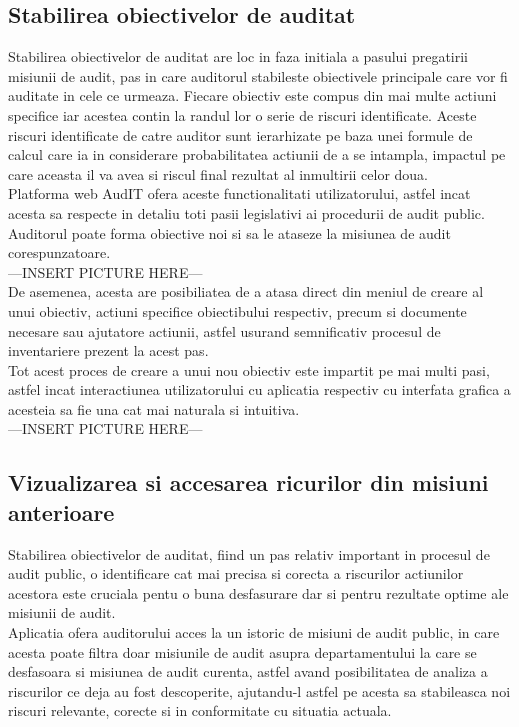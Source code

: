 \subsection{Stabilirea obiectivelor de auditat}

Stabilirea obiectivelor de auditat are loc in faza initiala a pasului pregatirii misiunii de audit, pas in care auditorul stabileste obiectivele principale care vor fi auditate in cele ce urmeaza. Fiecare obiectiv este compus din mai multe actiuni specifice iar acestea contin la randul lor o serie de riscuri identificate. Aceste riscuri identificate de catre auditor sunt ierarhizate pe baza unei formule de calcul care ia in considerare probabilitatea actiunii de a se intampla, impactul pe care aceasta il va avea si riscul final rezultat al inmultirii celor doua.\\
Platforma web AudIT ofera aceste functionalitati utilizatorului, astfel incat acesta sa respecte in detaliu toti pasii legislativi ai procedurii de audit public. Auditorul poate forma obiective noi si sa le ataseze la misiunea de audit corespunzatoare.\\
---INSERT PICTURE HERE---\\
De asemenea, acesta are posibiliatea de a atasa direct din meniul de creare al unui obiectiv, actiuni specifice obiectibului respectiv, precum si documente necesare sau ajutatore actiunii, astfel usurand semnificativ procesul de inventariere prezent la acest pas.\\
Tot acest proces  de creare a unui nou obiectiv este impartit pe mai multi pasi, astfel incat interactiunea utilizatorului cu aplicatia respectiv cu interfata grafica a acesteia sa fie una cat mai naturala si intuitiva.\\
---INSERT PICTURE HERE---

\subsection{Vizualizarea si accesarea ricurilor din misiuni anterioare}
Stabilirea obiectivelor de auditat, fiind un pas relativ important in procesul de audit public, o identificare cat mai precisa si corecta a riscurilor actiunilor acestora este cruciala pentu o buna desfasurare dar si pentru rezultate optime ale misiunii de audit.\\
Aplicatia ofera auditorului acces la un istoric de misiuni de audit public, in care acesta poate filtra doar misiunile de audit asupra departamentului la care se desfasoara si misiunea de audit curenta, astfel avand posibilitatea de analiza a riscurilor ce deja au fost descoperite, ajutandu-l 
astfel pe acesta sa stabileasca noi riscuri relevante, corecte si in conformitate cu situatia actuala.

